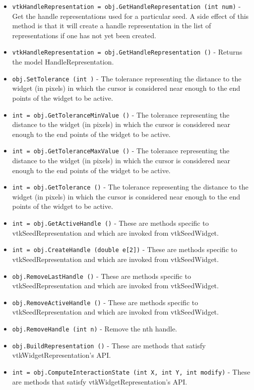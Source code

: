 \begin{itemize}
\item  \verb|vtkHandleRepresentation = obj.GetHandleRepresentation (int num)| -  Get the handle representations used for a particular seed. A side effect of
 this method is that it will create a handle representation in the list of
 representations if one has not yet been created.

\item  \verb|vtkHandleRepresentation = obj.GetHandleRepresentation ()| -  Returns the model HandleRepresentation.

\item  \verb|obj.SetTolerance (int )| -  The tolerance representing the distance to the widget (in pixels) in
 which the cursor is considered near enough to the end points of
 the widget to be active.

\item  \verb|int = obj.GetToleranceMinValue ()| -  The tolerance representing the distance to the widget (in pixels) in
 which the cursor is considered near enough to the end points of
 the widget to be active.

\item  \verb|int = obj.GetToleranceMaxValue ()| -  The tolerance representing the distance to the widget (in pixels) in
 which the cursor is considered near enough to the end points of
 the widget to be active.

\item  \verb|int = obj.GetTolerance ()| -  The tolerance representing the distance to the widget (in pixels) in
 which the cursor is considered near enough to the end points of
 the widget to be active.

\item  \verb|int = obj.GetActiveHandle ()| -  These are methods specific to vtkSeedRepresentation and which are
 invoked from vtkSeedWidget.

\item  \verb|int = obj.CreateHandle (double e[2])| -  These are methods specific to vtkSeedRepresentation and which are
 invoked from vtkSeedWidget.

\item  \verb|obj.RemoveLastHandle ()| -  These are methods specific to vtkSeedRepresentation and which are
 invoked from vtkSeedWidget.

\item  \verb|obj.RemoveActiveHandle ()| -  These are methods specific to vtkSeedRepresentation and which are
 invoked from vtkSeedWidget.

\item  \verb|obj.RemoveHandle (int n)| -  Remove the nth handle.

\item  \verb|obj.BuildRepresentation ()| -  These are methods that satisfy vtkWidgetRepresentation's API.

\item  \verb|int = obj.ComputeInteractionState (int X, int Y, int modify)| -  These are methods that satisfy vtkWidgetRepresentation's API.

\end{itemize}
